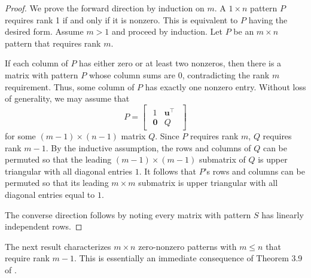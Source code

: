 \documentclass[preprint,12pt]{elsarticle}
\newcommand{\trans  }{^\top}
\begin{document}
\begin{proof}
We prove the forward direction by induction on $m$.
A $1 \times n$ pattern $P$ requires rank 1 if and only if it is nonzero. This is equivalent to $P$ having the desired form. 
Assume $m>1$ and proceed by induction. Let $P$ be an $m\times n$
pattern that requires rank $m$.

If each column of $P$ has either zero or at least two nonzeros, 
then there is a matrix with pattern $P$ whose column sums are 0, 
contradicting the rank $m$ requirement. Thus, some column of $P$ has exactly one nonzero entry.
Without  loss of generality, we may assume that 
\[
P= \begin{bmatrix}
\begin{array}{c|c}
    1 & \mathbf u\trans \\ \hline 
    \mathbf 0 & Q
    \end{array} 
\end{bmatrix}
\]
for some $(m-1)\times (n-1)$ matrix $Q$. 
Since $P$ requires rank $m$, $Q$ requires rank $m-1$.
By the inductive assumption, the rows and columns of $Q$ 
can be permuted so that the leading $(m-1)\times (m-1)$ 
submatrix of $Q$ is upper triangular with all diagonal entries $1$.
It follows that $P$'s rows and columns can be permuted so that 
its leading $m\times m$ submatrix is upper triangular with all diagonal entries equal to $1$.

The converse direction follows by noting 
every matrix with pattern $S$ has linearly independent rows. 
\end{proof}

The next result characterizes $m\times n $
zero-nonzero patterns with $m\leq n$ that require 
rank $m-1$.  This is essentially an immediate consequence of Theorem 3.9 of \cite{HershkowitzSchneider}.
\end{document}
